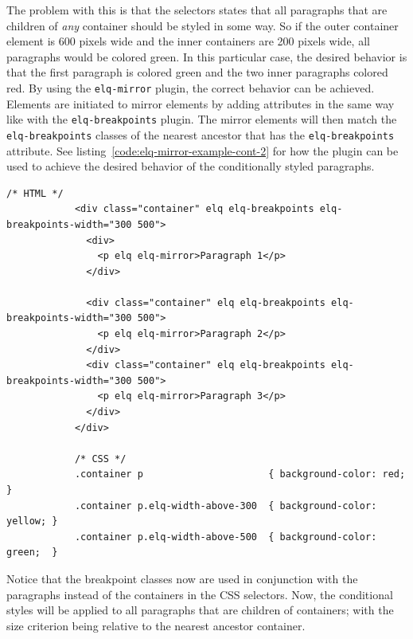 \documentclass[a4paper,11pt]{kth-mag}
\newcommand{\code}[1]{\texttt{#1}}
\begin{document}
          The problem with this is that the selectors states that all paragraphs that are children of \emph{any} container should be styled in some way.
          So if the outer container element is 600 pixels wide and the inner containers are 200 pixels wide, all paragraphs would be colored green.
          In this particular case, the desired behavior is that the first paragraph is colored green and the two inner paragraphs colored red.
          By using the \code{elq-mirror} plugin, the correct behavior can be achieved.
          Elements are initiated to mirror elements by adding attributes in the same way like with the \code{elq-breakpoints} plugin.
          The mirror elements will then match the \code{elq-breakpoints} classes of the nearest ancestor that has the \code{elq-breakpoints} attribute.
          See listing~\ref{code:elq-mirror-example-cont-2} for how the plugin can be used to achieve the desired behavior of the conditionally styled paragraphs.
          \begin{lstlisting}[gobble=12,caption={By using the \code{elq-mirror} plugin to overcome the limitations of CSS, the correct behavior can be achieved of the conditionally styled paragraphs.},captionpos=b,label={code:elq-mirror-example-cont-2}]
            /* HTML */
            <div class="container" elq elq-breakpoints elq-breakpoints-width="300 500">
              <div>
                <p elq elq-mirror>Paragraph 1</p>
              </div>

              <div class="container" elq elq-breakpoints elq-breakpoints-width="300 500">
                <p elq elq-mirror>Paragraph 2</p>
              </div>
              <div class="container" elq elq-breakpoints elq-breakpoints-width="300 500">
                <p elq elq-mirror>Paragraph 3</p>
              </div>
            </div>

            /* CSS */
            .container p                      { background-color: red;    }
            .container p.elq-width-above-300  { background-color: yellow; }
            .container p.elq-width-above-500  { background-color: green;  }
          \end{lstlisting}
          Notice that the breakpoint classes now are used in conjunction with the paragraphs instead of the containers in the CSS selectors.
          Now, the conditional styles will be applied to all paragraphs that are children of containers; with the size criterion being relative to the nearest ancestor container.
\end{document}
